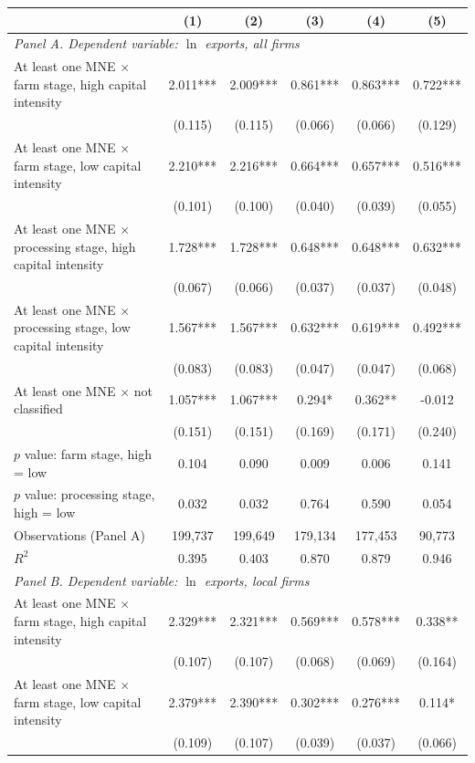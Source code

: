 \begin{tabular}{l*{5}{c}}
\toprule
 & (1) & (2) & (3) & (4) & (5) \\
\midrule
\multicolumn{6}{l}{\textit{Panel A. Dependent variable: $\ln$ exports, all firms}} \\
At least one MNE $\times$ farm stage, high capital intensity & 2.011*** & 2.009*** & 0.861*** & 0.863*** & 0.722*** \\
 & (0.115) & (0.115) & (0.066) & (0.066) & (0.129) \\
At least one MNE $\times$ farm stage, low capital intensity & 2.210*** & 2.216*** & 0.664*** & 0.657*** & 0.516*** \\
 & (0.101) & (0.100) & (0.040) & (0.039) & (0.055) \\
At least one MNE $\times$ processing stage, high capital intensity & 1.728*** & 1.728*** & 0.648*** & 0.648*** & 0.632*** \\
 & (0.067) & (0.066) & (0.037) & (0.037) & (0.048) \\
At least one MNE $\times$ processing stage, low capital intensity & 1.567*** & 1.567*** & 0.632*** & 0.619*** & 0.492*** \\
 & (0.083) & (0.083) & (0.047) & (0.047) & (0.068) \\
At least one MNE $\times$ not classified & 1.057*** & 1.067*** & 0.294* & 0.362** & -0.012 \\
 & (0.151) & (0.151) & (0.169) & (0.171) & (0.240) \\
$p$ value: farm stage, high = low & 0.104 & 0.090 & 0.009 & 0.006 & 0.141 \\
$p$ value: processing stage, high = low & 0.032 & 0.032 & 0.764 & 0.590 & 0.054 \\
Observations (Panel A) & 199,737 & 199,649 & 179,134 & 177,453 & 90,773 \\
$R^2$ & 0.395 & 0.403 & 0.870 & 0.879 & 0.946 \\
\midrule
\multicolumn{6}{l}{\textit{Panel B. Dependent variable: $\ln$ exports, local firms}} \\
At least one MNE $\times$ farm stage, high capital intensity & 2.329*** & 2.321*** & 0.569*** & 0.578*** & 0.338** \\
 & (0.107) & (0.107) & (0.068) & (0.069) & (0.164) \\
At least one MNE $\times$ farm stage, low capital intensity & 2.379*** & 2.390*** & 0.302*** & 0.276*** & 0.114* \\
 & (0.109) & (0.107) & (0.039) & (0.037) & (0.066) \\

\end{tabular}
